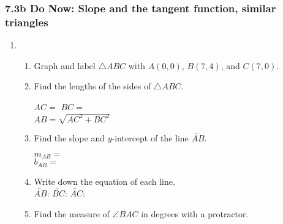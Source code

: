 \documentclass[12pt, twoside]{article}
\begin{document}
\subsubsection*{7.3b Do Now: Slope and the tangent function, similar triangles}
  \begin{enumerate}
  \item \begin{enumerate}
    \item Graph and label $\triangle ABC$ with $A(0,0)$, $B(7,4)$, and $C(7,0)$.
    \begin{center}
    \end{center}
    \item Find the lengths of the sides of $\triangle ABC$.
    \begin{multicols}{2}
      $AC=$ \hspace{3cm}
      $BC=$ \\[1cm]
      $AB=\sqrt{AC^2+BC^2}$
    \end{multicols} \vspace{2.5cm}
    \item Find the slope and $y$-intercept of the line $\overleftrightarrow{AB}$.
      \begin{multicols}{2}
        $m_{AB}=$ \\
        $b_{AB}=$
      \end{multicols} \vspace{0.5cm}
    \item Write down the equation of each line. \\[0.5cm]
      $\overleftrightarrow{AB}$: \hfill
      $\overleftrightarrow{BC}$: \hfill
      $\overleftrightarrow{AC}$: \hspace{2cm}
    \vspace{2cm}
    \item Find the measure of $\angle BAC$ in degrees with a protractor.
  \end{enumerate}


\end{enumerate}
\end{document}
